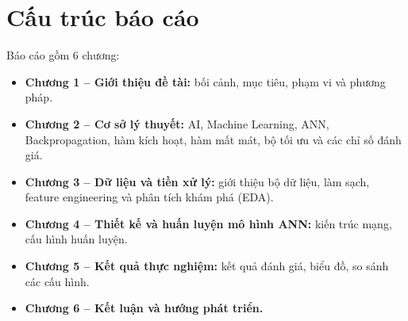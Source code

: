 \section{Cấu trúc báo cáo}
Báo cáo gồm 6 chương:
\begin{itemize}
  \item \textbf{Chương 1 -- Giới thiệu đề tài:} bối cảnh, mục tiêu, phạm vi và
        phương pháp.
  \item \textbf{Chương 2 -- Cơ sở lý thuyết:} AI, Machine Learning, ANN,
        Backpropagation, hàm kích hoạt, hàm mất mát, bộ tối ưu và các chỉ số
        đánh giá.
  \item \textbf{Chương 3 -- Dữ liệu và tiền xử lý:} giới thiệu bộ dữ liệu, làm
        sạch, feature engineering và phân tích khám phá (EDA).
  \item \textbf{Chương 4 -- Thiết kế và huấn luyện mô hình ANN:} kiến trúc mạng,
        cấu hình huấn luyện.
  \item \textbf{Chương 5 -- Kết quả thực nghiệm:} kết quả đánh giá, biểu đồ, so
        sánh các cấu hình.
  \item \textbf{Chương 6 -- Kết luận và hướng phát triển.}
\end{itemize}
